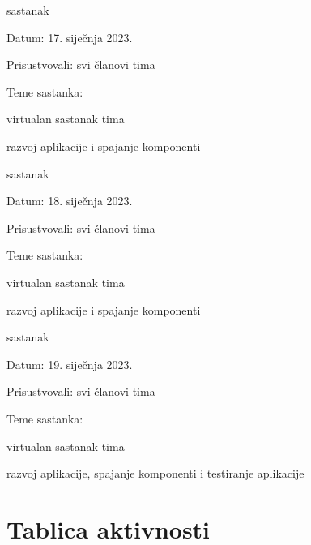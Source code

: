 \begin{packed_enum}
			\item  sastanak
			\item[] \begin{packed_item}
				\item Datum: 17. siječnja 2023.
				\item Prisustvovali: svi članovi tima
				\item Teme sastanka:
				\begin{packed_item}
					\item  virtualan sastanak tima
					\item  razvoj aplikacije i spajanje komponenti
				\end{packed_item}
			\end{packed_item}
			
			\item  sastanak
			\item[] \begin{packed_item}
				\item Datum: 18. siječnja 2023.
				\item Prisustvovali: svi članovi tima
				\item Teme sastanka:
				\begin{packed_item}
					\item  virtualan sastanak tima
					\item  razvoj aplikacije i spajanje komponenti
				\end{packed_item}
			\end{packed_item}
			
			\item  sastanak
			\item[] \begin{packed_item}
				\item Datum: 19. siječnja 2023.
				\item Prisustvovali: svi članovi tima
				\item Teme sastanka:
				\begin{packed_item}
					\item  virtualan sastanak tima
					\item  razvoj aplikacije, spajanje komponenti i testiranje aplikacije
				\end{packed_item}
			\end{packed_item}
			
			
		\end{packed_enum}
		
		\eject
		\section*{Tablica aktivnosti}
		


